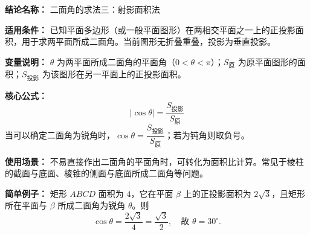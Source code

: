 \textbf{结论名称：} 二面角的求法三：射影面积法

\textbf{适用条件：} 已知平面多边形（或一般平面图形）在两相交平面之一上的正投影面积，用于求两平面所成二面角。当前图形无折叠重叠，投影为垂直投影。

\textbf{变量说明：} $\theta$ 为两平面所成二面角的平面角（$0<\theta<\pi$）；$S_{\text{原}}$ 为原平面图形的面积；$S_{\text{投影}}$ 为该图形在另一平面上的正投影面积。

\textbf{核心公式：} 
\[
\boxed{|\cos\theta| = \frac{S_{\text{投影}}}{S_{\text{原}}}}
\]
当可以确定二面角为锐角时，$\cos\theta = \dfrac{S_{\text{投影}}}{S_{\text{原}}}$；若为钝角则取负号。

\textbf{使用场景：} 不易直接作出二面角的平面角时，可转化为面积比计算。常见于棱柱的截面与底面、棱锥的侧面与底面所成二面角等问题。

\textbf{简单例子：} 矩形 $ABCD$ 面积为 $4$，它在平面 $\beta$ 上的正投影面积为 $2\sqrt{3}$，且矩形所在平面与 $\beta$ 所成二面角为锐角 $\theta$。则
\[
\cos\theta = \frac{2\sqrt{3}}{4} = \frac{\sqrt{3}}{2},\quad \text{故 } \theta = 30^\circ.
\]